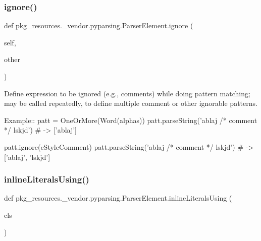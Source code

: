 \subsubsection{\texorpdfstring{ignore()}{ignore()}}
{\footnotesize\ttfamily def pkg\+\_\+resources.\+\_\+vendor.\+pyparsing.\+Parser\+Element.\+ignore (\begin{DoxyParamCaption}\item[{}]{self,  }\item[{}]{other }\end{DoxyParamCaption})}

\begin{DoxyVerb}Define expression to be ignored (e.g., comments) while doing pattern
matching; may be called repeatedly, to define multiple comment or other
ignorable patterns.

Example::
    patt = OneOrMore(Word(alphas))
    patt.parseString('ablaj /* comment */ lskjd') # -> ['ablaj']
    
    patt.ignore(cStyleComment)
    patt.parseString('ablaj /* comment */ lskjd') # -> ['ablaj', 'lskjd']
\end{DoxyVerb}
 \mbox{\label{classpkg__resources_1_1__vendor_1_1pyparsing_1_1ParserElement_a0cc7c1046ec15301a82d135bad3190ba}} 
\subsubsection{\texorpdfstring{inline\+Literals\+Using()}{inlineLiteralsUsing()}}
{\footnotesize\ttfamily def pkg\+\_\+resources.\+\_\+vendor.\+pyparsing.\+Parser\+Element.\+inline\+Literals\+Using (\begin{DoxyParamCaption}\item[{}]{cls }\end{DoxyParamCaption})\hspace{0.3cm}{\ttfamily [static]}}

